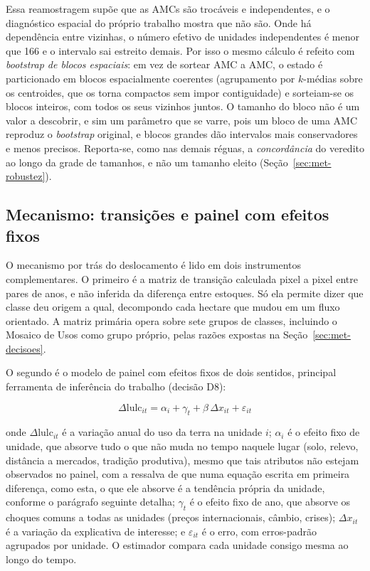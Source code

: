 Essa reamostragem supõe que as AMCs são trocáveis e independentes, e o
diagnóstico espacial do próprio trabalho mostra que não são. Onde há dependência
entre vizinhas, o número efetivo de unidades independentes é menor que 166 e o
intervalo sai estreito demais. Por isso o mesmo cálculo é refeito com
\emph{bootstrap de blocos espaciais}: em vez de sortear AMC a AMC, o estado é
particionado em blocos espacialmente coerentes (agrupamento por $k$-médias
sobre os centroides, que os torna compactos sem impor contiguidade) e
sorteiam-se os blocos inteiros, com todos os seus vizinhos juntos. O tamanho
do bloco não é um valor a descobrir, e sim um parâmetro que se varre, pois um
bloco de uma AMC reproduz o \emph{bootstrap} original, e blocos
grandes dão intervalos mais conservadores e menos precisos. Reporta-se, como
nas demais réguas, a \emph{concordância} do veredito ao longo da grade de
tamanhos, e não um tamanho eleito (Seção~\ref{sec:met-robustez}).

\subsection{Mecanismo: transições e painel com efeitos fixos}

O mecanismo por trás do deslocamento é lido em dois instrumentos
complementares. O primeiro é a matriz de transição calculada pixel a pixel
entre pares de anos, e não inferida da diferença entre estoques. Só ela
permite dizer que classe deu origem a qual, decompondo cada hectare que mudou
em um fluxo orientado. A matriz primária opera sobre sete grupos de classes,
incluindo o Mosaico de Usos como grupo próprio, pelas razões expostas na
Seção~\ref{sec:met-decisoes}.

O segundo é o modelo de painel com efeitos fixos de dois sentidos, principal
ferramenta de inferência do trabalho (decisão D8):

\begin{equation}
\Delta \mathrm{lulc}_{it} = \alpha_i + \gamma_t + \beta \,\Delta x_{it} + \varepsilon_{it}
\label{eq:2fe}
\end{equation}

\noindent onde $\Delta \mathrm{lulc}_{it}$ é a variação anual do uso da terra
na unidade $i$; $\alpha_i$ é o efeito fixo de unidade, que absorve tudo o que
não muda no tempo naquele lugar (solo, relevo, distância a mercados, tradição
produtiva), mesmo que tais atributos não estejam observados no painel, com a
ressalva de que numa equação escrita em primeira diferença, como esta, o que
ele absorve é a tendência própria da unidade, conforme o parágrafo seguinte
detalha;
$\gamma_t$ é o efeito fixo de ano, que absorve os choques comuns a todas as
unidades (preços internacionais, câmbio, crises); $\Delta x_{it}$ é a variação
da explicativa de interesse; e $\varepsilon_{it}$ é o erro, com erros-padrão
agrupados por unidade. O estimador compara cada unidade consigo mesma ao longo
do tempo.

